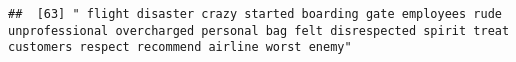 \documentclass[
]{article}
\begin{document}
\begin{verbatim}
##  [63] " flight disaster crazy started boarding gate employees rude unprofessional overcharged personal bag felt disrespected spirit treat customers respect recommend airline worst enemy"                                                                                                                                                                                                                                                                                                                                                                                                                                                                                                                                                                                                                                                                                                                                                                                                                                                                                                                                                                                                                                                                                                                                                                                                                                                                                                                                                                                                                                                                                                                                                                                                            

\end{verbatim}
\end{document}
